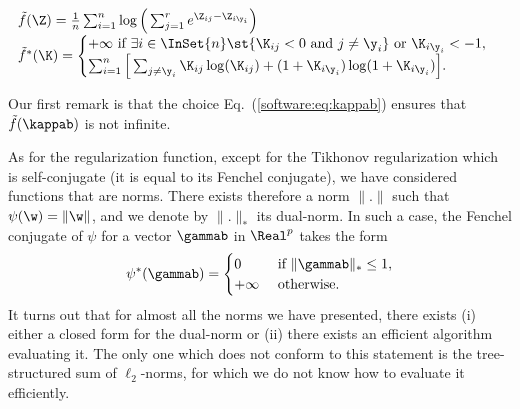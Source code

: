 \documentclass[a4paper, 11pt]{article}
\begin{document}
\begin{itemize}
$$\begin{array}{l}
                                                  \tilde{f}(\Z)=\frac{1}{n}\sum_{i=1}^n \log\Big(\sum_{j=1}^r e^{ \Z_{ij} - \Z_{i\y_i}}\Big)  \\
                                                     \tilde{f}^\ast(\K)=\begin{cases}
                                                     +\infty ~\text{if}~ \exists i \in\InSet{n} \st \{ \K_{ij} < 0 ~\text{and}~ j \neq \y_i \} ~\text{or}~ \K_{i\y_i} < -1,\\
                                                        \sum_{i=1}^n \Big[\sum_{j \neq \y_i}\K_{ij}\log(\K_{ij}) + (1+\K_{i \y_i})\log(1+\K_{i \y_i})\Big].
                                                        \end{cases}
                                                        \end{array}
                                                        $$
                                                        \end{itemize}

                                                        Our first remark is that the choice Eq.~(\ref{software:eq:kappab}) ensures
                                                        that $\tilde{f}(\kappab)$ is not infinite.

                                                        As for the regularization function, except for the Tikhonov regularization
                                                        which is self-conjugate (it is equal to its Fenchel conjugate), we have
                                                        considered functions that are norms. There exists therefore a norm $\|.\|$ such
                                                        that $\psi(\w)=\|\w\|$, and we denote by $\|.\|_\ast$ its dual-norm.  In such a
                                                        case, the Fenchel conjugate of $\psi$ for a vector $\gammab$ in $\Real^p$ takes the
                                                        form
                                                        \begin{displaymath}
                                                        \psi^\ast(\gammab) = \begin{cases}
                                                        0 &~\text{if}~ \|\gammab\|_\ast \leq 1, \\
                                                           +\infty &~\text{otherwise}.
                                                           \end{cases}
                                                           \end{displaymath}
It turns out that for almost all the norms we have presented, there exists (i)
   either a closed form for the dual-norm or (ii) there exists an 
   efficient algorithm evaluating it. The only one which does not conform to this
   statement is the tree-structured sum of $\ell_2$-norms, for which we do not know
   how to evaluate it efficiently.
\end{document}
